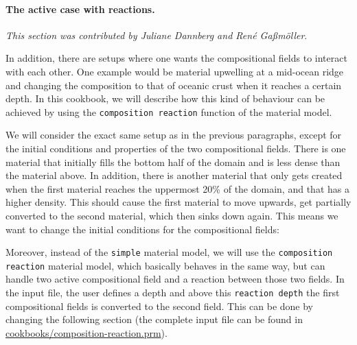 \documentclass{article}
\begin{document}
\paragraph{The active case with reactions.}

\textit{This section was contributed by Juliane Dannberg and Ren{\'e} Ga{\ss}m{\"o}ller}.

In addition, there are setups where one wants the compositional fields to interact with each other. One example would be material upwelling at a mid-ocean ridge and changing the composition to that of oceanic crust when it reaches a certain depth. In this cookbook, we will describe how this kind of behaviour can be achieved by using the \texttt{composition reaction} function of the material model. 

We will consider the exact same setup as in the previous paragraphs, except for the initial conditions and properties of the two compositional fields. There is one material that initially fills the bottom half of the domain and is less dense than the material above. In addition, there is another material that only gets created when the first material reaches the uppermost 20\% of the domain, and that has a higher density. This should cause the first material to move upwards, get partially converted to the second material, which then sinks down again. This means we want to change the initial conditions for the compositional fields: 




Moreover, instead of the \texttt{simple} material model, we will use the \texttt{composition reaction} material model, which basically behaves in the same way, but can handle two active compositional field and a reaction between those two fields. In the input file, the user defines a depth and above this \texttt{reaction depth} the first compositional fields is converted to the second field. This can be done by changing the following section (the complete input file can be found in \url{cookbooks/composition-reaction.prm}). 


\end{document}
